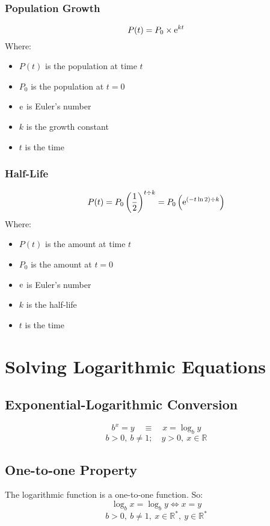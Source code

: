 			\begin{minipage}{0.45\textwidth}
				\subsubsection{Population Growth}
					\[P(t) = P_0 \times \mathrm{e}^{kt}\]
					Where:
					\begin{itemize}
						\item $P(t)$ is the population at time $t$
						\item $P_0$ is the population at $t=0$
						\item $\mathrm{e}$ is Euler's number
						\item $k$ is the growth constant
						\item $t$ is the time
					\end{itemize}
			\end{minipage}
			\hspace{0.1\textwidth}
			\begin{minipage}{0.45\textwidth}
				\subsubsection{Half-Life}
					\[P(t)=P_0\left(\frac{1}{2}\right)^{t \div k}=P_0\left(\mathrm{e}^{(-t \ln 2) \div k}\right)\]
					Where:
					\begin{itemize}
						\item $P(t)$ is the amount at time $t$
						\item $P_0$ is the amount at $t=0$
						\item $\mathrm{e}$ is Euler's number
						\item $k$ is the half-life
						\item $t$ is the time
					\end{itemize}
			\end{minipage}
	\section{Solving Logarithmic Equations}
		\subsection{Exponential-Logarithmic Conversion}
			\[b^x=y \quad \equiv \quad x=\log_b y\]
			\[b > 0,\ b \neq 1; \quad y > 0,\ x \in \mathbb{R}\]
		\subsection{One-to-one Property}
			The logarithmic function is a one-to-one function. So:
			\[\log_b x = \log_b y \iff x = y\]
			\[b > 0,\ b \neq 1,\ x \in \mathbb{R^*},\ y \in \mathbb{R^*}\]
